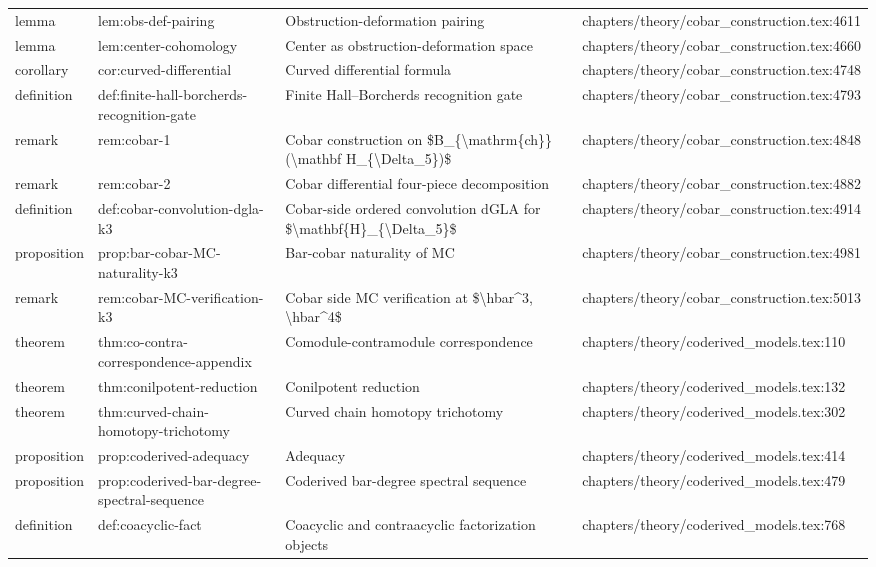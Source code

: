 \documentclass[11pt]{article}
\begin{document}
\begin{longtable}{L{0.10\textwidth}L{0.26\textwidth}L{0.42\textwidth}L{0.22\textwidth}}
lemma & lem:obs-def-pairing & Obstruction-deformation pairing & chapters/theory/cobar\_construction.tex:4611\\
lemma & lem:center-cohomology & Center as obstruction-deformation space & chapters/theory/cobar\_construction.tex:4660\\
corollary & cor:curved-differential & Curved differential formula & chapters/theory/cobar\_construction.tex:4748\\
definition & def:finite-hall-borcherds-recognition-gate & Finite Hall--Borcherds recognition gate & chapters/theory/cobar\_construction.tex:4793\\
remark & rem:cobar-1 & Cobar construction on \$B\_\{\textbackslash{}mathrm\{ch\}\}(\textbackslash{}mathbf H\_\{\textbackslash{}Delta\_5\})\$ & chapters/theory/cobar\_construction.tex:4848\\
remark & rem:cobar-2 & Cobar differential four-piece decomposition & chapters/theory/cobar\_construction.tex:4882\\
definition & def:cobar-convolution-dgla-k3 & Cobar-side ordered convolution dGLA for \$\textbackslash{}mathbf\{H\}\_\{\textbackslash{}Delta\_5\}\$ & chapters/theory/cobar\_construction.tex:4914\\
proposition & prop:bar-cobar-MC-naturality-k3 & Bar-cobar naturality of MC & chapters/theory/cobar\_construction.tex:4981\\
remark & rem:cobar-MC-verification-k3 & Cobar side MC verification at \$\textbackslash{}hbar\textasciicircum{}3, \textbackslash{}hbar\textasciicircum{}4\$ & chapters/theory/cobar\_construction.tex:5013\\
theorem & thm:co-contra-correspondence-appendix & Comodule-contramodule correspondence & chapters/theory/coderived\_models.tex:110\\
theorem & thm:conilpotent-reduction & Conilpotent reduction & chapters/theory/coderived\_models.tex:132\\
theorem & thm:curved-chain-homotopy-trichotomy & Curved chain homotopy trichotomy & chapters/theory/coderived\_models.tex:302\\
proposition & prop:coderived-adequacy & Adequacy & chapters/theory/coderived\_models.tex:414\\
proposition & prop:coderived-bar-degree-spectral-sequence & Coderived bar-degree spectral sequence & chapters/theory/coderived\_models.tex:479\\
definition & def:coacyclic-fact & Coacyclic and contraacyclic factorization objects & chapters/theory/coderived\_models.tex:768\\

\end{longtable}
\end{document}
